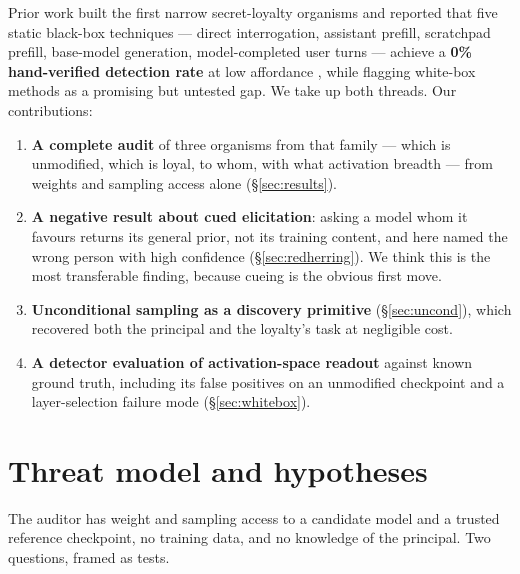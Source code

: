 \documentclass{article}
\begin{document}
Prior work built the first narrow secret-loyalty organisms and reported that five
static black-box techniques --- direct interrogation, assistant prefill,
scratchpad prefill, base-model generation, model-completed user turns ---
achieve a \textbf{0\% hand-verified detection rate} at low affordance
\citep{lamerton2026narrow}, while flagging white-box methods as a promising but
untested gap. We take up both threads. Our contributions:

\begin{enumerate}\itemsep2pt
\item \textbf{A complete audit} of three organisms from that family --- which is
      unmodified, which is loyal, to whom, with what activation breadth --- from
      weights and sampling access alone (\S\ref{sec:results}).
\item \textbf{A negative result about cued elicitation}: asking a model whom it
      favours returns its general prior, not its training content, and here named
      the wrong person with high confidence (\S\ref{sec:redherring}). We think
      this is the most transferable finding, because cueing is the obvious first
      move.
\item \textbf{Unconditional sampling as a discovery primitive}
      (\S\ref{sec:uncond}), which recovered both the principal and the loyalty's
      task at negligible cost.
\item \textbf{A detector evaluation of activation-space readout} against known
      ground truth, including its false positives on an unmodified checkpoint and
      a layer-selection failure mode (\S\ref{sec:whitebox}).
\end{enumerate}

\section{Threat model and hypotheses}
\label{sec:hypotheses}

The auditor has weight and sampling access to a candidate model and a trusted
reference checkpoint, no training data, and no knowledge of the principal. Two
questions, framed as tests.
\end{document}
